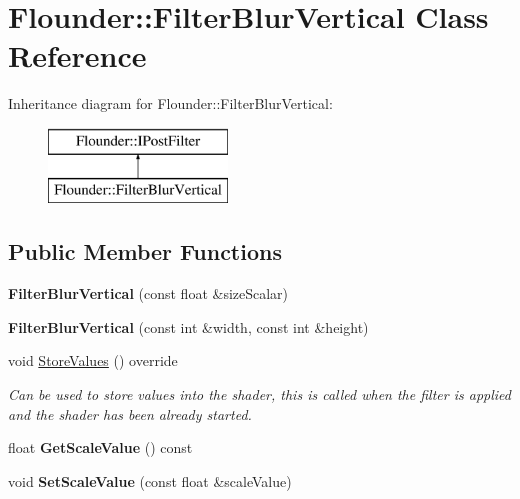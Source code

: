 \hypertarget{class_flounder_1_1_filter_blur_vertical}{}\section{Flounder\+:\+:Filter\+Blur\+Vertical Class Reference}
\label{class_flounder_1_1_filter_blur_vertical}
Inheritance diagram for Flounder\+:\+:Filter\+Blur\+Vertical\+:\begin{figure}[H]
\begin{center}
\leavevmode
\includegraphics[height=2.000000cm]{class_flounder_1_1_filter_blur_vertical}
\end{center}
\end{figure}
\subsection*{Public Member Functions}
\begin{DoxyCompactItemize}
\item 
\mbox{\label{class_flounder_1_1_filter_blur_vertical_a3a1e23a93ddfaab611a158bf0383db16}} 
{\bfseries Filter\+Blur\+Vertical} (const float \&size\+Scalar)
\item 
\mbox{\label{class_flounder_1_1_filter_blur_vertical_a74f1611ac43e0f4e3652f2617ce50084}} 
{\bfseries Filter\+Blur\+Vertical} (const int \&width, const int \&height)
\item 
void \hyperlink{class_flounder_1_1_filter_blur_vertical_af3c9f462370e127b58636b8de79c341e}{Store\+Values} () override
\begin{DoxyCompactList}\small\item\em Can be used to store values into the shader, this is called when the filter is applied and the shader has been already started. \end{DoxyCompactList}\item 
\mbox{\label{class_flounder_1_1_filter_blur_vertical_a8824db325357880c80b7466e971b1e18}} 
float {\bfseries Get\+Scale\+Value} () const
\item 
\mbox{\label{class_flounder_1_1_filter_blur_vertical_a106b4592a7623ed30792a995abd0bfbf}} 
void {\bfseries Set\+Scale\+Value} (const float \&scale\+Value)
\end{DoxyCompactItemize}
